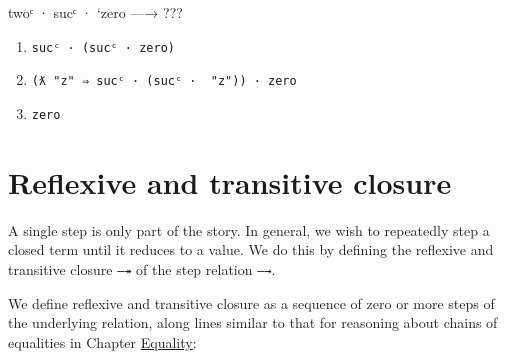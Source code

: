 \begin{myDisplay}
twoᶜ · sucᶜ · `zero  —→  ???
\end{myDisplay}

\begin{enumerate}
\def\labelenumi{\arabic{enumi}.}
\tightlist
\item
  \texttt{sucᶜ\ ·\ (sucᶜ\ ·\ \textasciigrave{}zero)}
\item
  \texttt{(ƛ\ "z"\ ⇒\ sucᶜ\ ·\ (sucᶜ\ ·\ \textasciigrave{}\ "z"))\ ·\ \textasciigrave{}zero}
\item
  \texttt{\textasciigrave{}zero}
\end{enumerate}

\hypertarget{reflexive-and-transitive-closure}{%
\section{Reflexive and transitive
closure}\label{reflexive-and-transitive-closure}}

A single step is only part of the story. In general, we wish to
repeatedly step a closed term until it reduces to a value. We do this by
defining the reflexive and transitive closure \texttt{—↠} of the step
relation \texttt{—→}.

We define reflexive and transitive closure as a sequence of zero or more
steps of the underlying relation, along lines similar to that for
reasoning about chains of equalities in Chapter
\protect\hyperlink{Equality}{Equality}:

